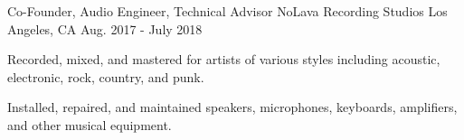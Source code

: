 \begin{cventries}


    \cventry
    {Co-Founder, Audio Engineer, Technical Advisor} %
    {NoLava Recording Studios} %
    {Los Angeles, CA} %
    {Aug. 2017 - July 2018} %
    {
      \begin{cvitems} %
        \item {Recorded, mixed, and mastered for artists of various styles including acoustic, electronic, rock, country, and punk.}
        \item {Installed, repaired, and maintained speakers, microphones, keyboards, amplifiers, and other musical equipment.}
      \end{cvitems}
    }

\end{cventries}
